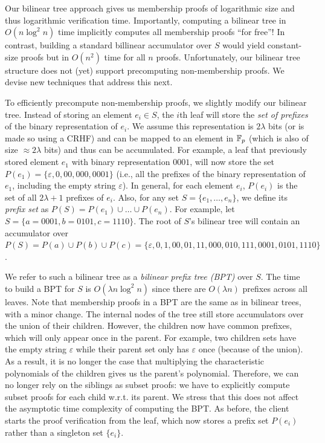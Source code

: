 Our bilinear tree approach gives us membership proofs of logarithmic size and thus logarithmic verification time.
Importantly, computing a bilinear tree in $O(n\log^2{n})$ time implicitly computes all membership proofs ``for free''!
In contrast, building a standard billinear accumulator over $S$ would yield constant-size proofs but in $O(n^2)$ time for all $n$ proofs.
Unfortunately, our bilinear tree structure does not (yet) support precomputing non-membership proofs.
We devise new techniques that address this next.

To efficiently precompute non-membership proofs, we slightly modify our bilinear tree.
Instead of storing an element $e_i \in S$, the $i$th leaf will store the \emph{set of prefixes} of the binary representation of $e_i$.
We assume this representation is $2\lambda$ bits (or is made so using a CRHF) and can be mapped to an element in $\mathbb{F}_p$ (which is also of size $\approx 2\lambda$ bits) and thus can be accumulated.
For example, a leaf that previously stored element $e_1$ with binary representation $0001$, will now store the set $P(e_1) = \{\varepsilon,0,00,000,0001\}$ (i.e., all the prefixes of the binary representation of $e_1$, including the empty string $\varepsilon$).
In general, for each element $e_i$, $P(e_i)$ is the set of all $2\lambda+1$ prefixes of $e_i$.
Also, for any set $S = \{e_1,\dots,e_n\}$, we define its \emph{prefix set} as $P(S) = P(e_1) \cup \dots \cup P(e_n)$.
For example, let $S =\{a=0001,b=0101,c=1110\}$.
The root of $S$'s bilinear tree will contain an accumulator over $P(S) = P(a) \cup P(b) \cup P(c) = \{\varepsilon,0,1,00,01,11,000,010,111,0001,0101,1110\}$.

We refer to such a bilinear tree as a \emph{bilinear prefix tree (BPT)} over $S$.
The time to build a BPT for $S$ is $O(\lambda n\log^2{n})$ since there are $O(\lambda n)$ prefixes across all leaves.
Note that membership proofs in a BPT are the same as in bilinear trees, with a minor change.
The internal nodes of the tree still store accumulators over the union of their children.
However, the children now have common prefixes, which will only appear once in the parent.
For example, two children sets have the empty string $\varepsilon$ while their parent set only has $\varepsilon$ once (because of the union).
As a result, it is no longer the case that multiplying the characteristic polynomials of the children gives us the parent's polynomial.
Therefore, we can no longer rely on the siblings as subset proofs: we have to explicitly compute subset proofs for each child w.r.t. its parent.
We stress that this does not affect the asymptotic time complexity of computing the BPT.
As before, the client starts the proof verification from the leaf, which now stores a prefix set $P(e_i)$ rather than a singleton set $\{e_i\}$.

